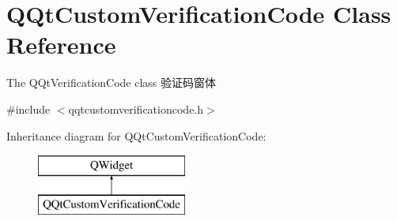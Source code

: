 \hypertarget{class_q_qt_custom_verification_code}{}\section{Q\+Qt\+Custom\+Verification\+Code Class Reference}
\label{class_q_qt_custom_verification_code}


The Q\+Qt\+Verification\+Code class 验证码窗体  




{\ttfamily \#include $<$qqtcustomverificationcode.\+h$>$}

Inheritance diagram for Q\+Qt\+Custom\+Verification\+Code\+:\begin{figure}[H]
\begin{center}
\leavevmode
\includegraphics[height=2.000000cm]{class_q_qt_custom_verification_code}
\end{center}
\end{figure}
